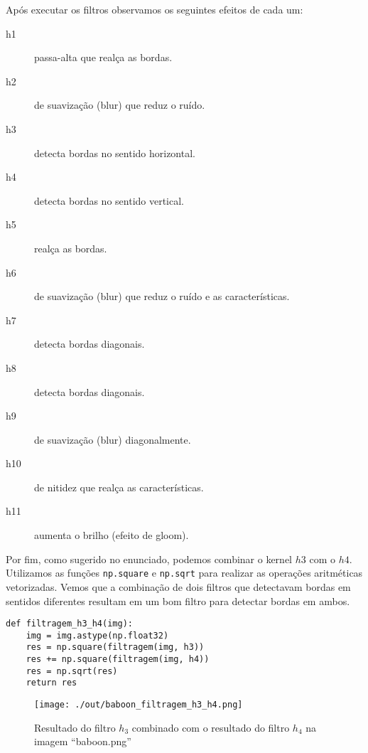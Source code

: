 \documentclass[11pt]{article}
\begin{document}
Após executar os filtros observamos os seguintes efeitos de cada um:
\begin{description}
\item[{h1}] passa-alta que realça as bordas.
\item[{h2}] de suavização (blur) que reduz o ruído.
\item[{h3}] detecta bordas no sentido horizontal.
\item[{h4}] detecta bordas no sentido vertical.
\item[{h5}] realça as bordas.
\item[{h6}] de suavização (blur) que reduz o ruído e as características.
\item[{h7}] detecta bordas diagonais.
\item[{h8}] detecta bordas diagonais.
\item[{h9}] de suavização (blur) diagonalmente.
\item[{h10}] de nitidez que realça as características.
\item[{h11}] aumenta o brilho (efeito de gloom).
\end{description}

Por fim, como sugerido no enunciado, podemos combinar o kernel \(h3\) com o \(h4\).
Utilizamos as funções \texttt{np.square} e \texttt{np.sqrt} para realizar as operações aritméticas vetorizadas.
Vemos que a combinação de dois filtros que detectavam bordas em sentidos diferentes resultam em um bom filtro para detectar bordas em ambos.
\begin{verbatim}
def filtragem_h3_h4(img):
    img = img.astype(np.float32)
    res = np.square(filtragem(img, h3))
    res += np.square(filtragem(img, h4))
    res = np.sqrt(res)
    return res
\end{verbatim}
\begin{figure}[H]
\centering
\texttt{[image: ./out/baboon\_filtragem\_h3\_h4.png]}
\caption{Resultado do filtro \(h_3\) combinado com o resultado do filtro \(h_4\) na imagem ``baboon.png''}
\end{figure}
\end{document}
